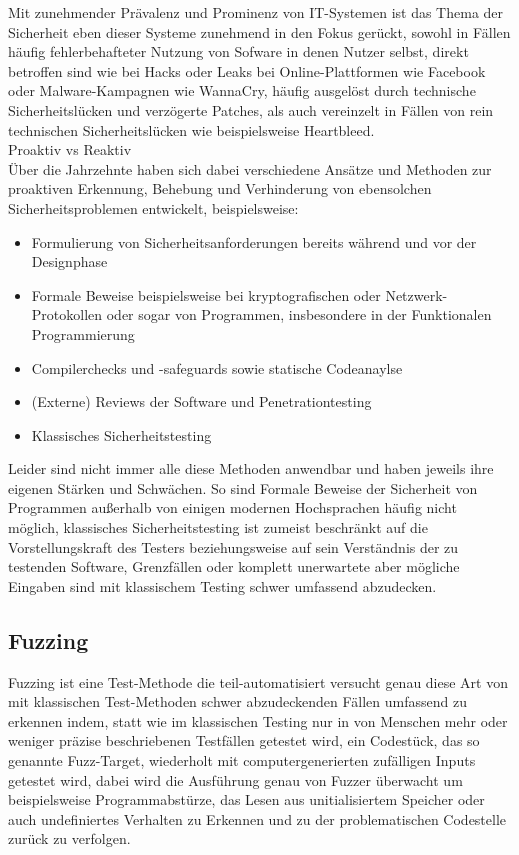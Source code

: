 \documentclass[12pt]{scrartcl}
\begin{document}
Mit zunehmender Prävalenz und Prominenz von IT-Systemen ist das Thema der Sicherheit eben dieser Systeme zunehmend in den Fokus gerückt, sowohl in Fällen häufig fehlerbehafteter Nutzung von Sofware in denen Nutzer selbst, direkt betroffen sind wie bei Hacks oder Leaks bei Online-Plattformen wie Facebook oder Malware-Kampagnen wie WannaCry, häufig ausgelöst durch technische Sicherheitslücken und verzögerte Patches, als auch vereinzelt in Fällen von rein technischen Sicherheitslücken wie beispielsweise Heartbleed.\\
Proaktiv vs Reaktiv\\
Über die Jahrzehnte haben sich dabei verschiedene Ansätze und Methoden zur proaktiven Erkennung, Behebung und Verhinderung von ebensolchen Sicherheitsproblemen entwickelt, beispielsweise:
\begin{itemize}
\item Formulierung von Sicherheitsanforderungen bereits während und vor der Designphase
\item Formale Beweise beispielsweise bei kryptografischen oder Netzwerk-Protokollen oder sogar von Programmen, insbesondere in der Funktionalen Programmierung
\item Compilerchecks und -safeguards sowie statische Codeanaylse
\item (Externe) Reviews der Software und Penetrationtesting
\item Klassisches Sicherheitstesting
\end{itemize}
Leider sind nicht immer alle diese Methoden anwendbar und haben jeweils ihre eigenen Stärken und Schwächen. So sind Formale Beweise der Sicherheit von Programmen außerhalb von einigen modernen Hochsprachen häufig nicht möglich, klassisches Sicherheitstesting ist zumeist beschränkt auf die Vorstellungskraft des Testers beziehungsweise auf sein Verständnis der zu testenden Software, Grenzfällen oder komplett unerwartete aber mögliche Eingaben sind mit klassischem Testing schwer umfassend abzudecken.\\

\subsection{Fuzzing}

Fuzzing ist eine Test-Methode die teil-automatisiert versucht genau diese Art von mit klassischen Test-Methoden schwer abzudeckenden Fällen umfassend zu erkennen indem, statt wie im klassischen Testing nur in von Menschen mehr oder weniger präzise beschriebenen Testfällen getestet wird, ein Codestück, das so genannte Fuzz-Target, wiederholt mit computergenerierten zufälligen Inputs getestet wird, dabei wird die Ausführung genau von Fuzzer überwacht um beispielsweise Programmabstürze, das Lesen aus unitialisiertem Speicher oder auch undefiniertes Verhalten zu Erkennen und zu der problematischen Codestelle zurück zu verfolgen.
\end{document}
